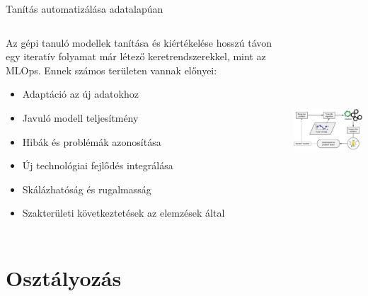 \documentclass[english, aspectratio=169]{beamer}
\makeatletter
\let\origtableofcontents=\tableofcontents
\def\tableofcontents{\@ifnextchar[{\origtableofcontents}{\gobbletableofcontents}}
\def\gobbletableofcontents#1{\origtableofcontents}
\makeatother
\begin{document}
\begin{frame}{Tanítás automatizálása adatalapúan}
\begin{columns}
\begin{column}{.5\textwidth}
Az gépi tanuló modellek tanítása és kiértékelése hosszú távon egy iteratív folyamat már létező keretrendszerekkel, mint az MLOps. Ennek számos területen vannak előnyei:
\begin{itemize}
	\item Adaptáció az új adatokhoz
	\item Javuló modell teljesítmény
	\item Hibák és problémák azonosítása
	\item Új technológiai fejlődés integrálása
	\item Skálázhatóság és rugalmasság
	\item Szakterületi következtetések az elemzések által
\end{itemize}
\end{column}
\begin{column}{.5\textwidth}
\begin{center}
\includegraphics[width=7cm, height=7cm, keepaspectratio]{images/osztalyozas_3.png}
\end{center}
\end{column}
\end{columns}
\end{frame}

\section{Osztályozás}

\begin{frame}
\tableofcontents[currentsection]
\end{frame}
\end{document}
